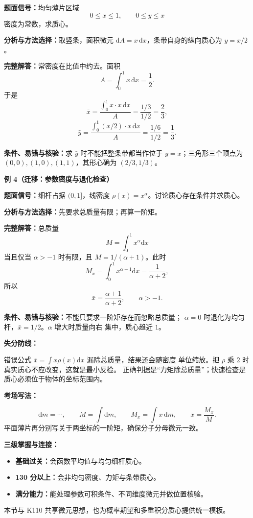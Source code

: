 \begin{knowledgeBox}
\textbf{题面信号：}均匀薄片区域
\[
0\le x\le1,\qquad0\le y\le x
\]
密度为常数，求质心。

\textbf{分析与方法选择：}取竖条，面积微元
\(\mathrm dA=x\,\mathrm dx\)，条带自身的纵向质心为 \(y=x/2\)。

\textbf{完整解答：}常密度在比值中约去。面积
\[
A=\int_0^1x\,\mathrm dx=\frac12.
\]
于是
\[
\bar x=\frac{\int_0^1x\cdot x\,\mathrm dx}{A}
=\frac{1/3}{1/2}=\frac23,
\]
\[
\bar y=\frac{\int_0^1(x/2)\cdot x\,\mathrm dx}{A}
=\frac{1/6}{1/2}=\frac13.
\]

\textbf{条件、易错与核验：}求 \(\bar y\) 时不能把整条带都当作位于
\(y=x\)；三角形三个顶点为 \((0,0),(1,0),(1,1)\)，其形心确为
\((2/3,1/3)\)。

\textbf{例 4（迁移：参数密度与退化检查）}

\textbf{题面信号：}细杆占据 \((0,1]\)，线密度
\(\rho(x)=x^\alpha\)。讨论质心存在条件并求质心。

\textbf{分析与方法选择：}先要求总质量有限；再算一阶矩。

\textbf{完整解答：}总质量
\[
M=\int_0^1x^\alpha\mathrm dx
\]
当且仅当 \(\alpha>-1\) 时有限，且 \(M=1/(\alpha+1)\)。此时
\[
M_x=\int_0^1x^{\alpha+1}\mathrm dx=\frac1{\alpha+2},
\]
所以
\[
\boxed{\bar x=\frac{\alpha+1}{\alpha+2}},\qquad\alpha>-1.
\]

\textbf{条件、易错与核验：}不能只要求一阶矩存在而忽略总质量；
\(\alpha=0\) 时退化为均匀杆，\(\bar x=1/2\)。\(\alpha\) 增大时质量向右
集中，质心趋近 \(1\)。

\textbf{失分防线：}

错误公式 \(\bar x=\int x\rho(x)\mathrm dx\) 漏除总质量，结果还会随密度
单位缩放。把 \(\rho\) 乘 \(2\) 时真实质心不应改变，这就是最小反检。
正确判据是“力矩除总质量”；快速检查是质心必须位于物体的坐标范围内。

\textbf{考场写法：}

\[
\mathrm dm=\cdots,\qquad
M=\int\mathrm dm,\qquad
M_x=\int x\,\mathrm dm,\qquad
\bar x=\frac{M_x}{M}.
\]
平面薄片再分别写关于两坐标的一阶矩，确保分子分母微元一致。

\textbf{三级掌握与连接：}
\begin{itemize}
  \item \textbf{基础过关：}会函数平均值与均匀细杆质心。
  \item \textbf{130 分以上：}会非均匀密度、力矩与条带质心。
  \item \textbf{满分能力：}能处理参数可积条件、不同维度微元并做位置核验。
\end{itemize}
本节与 K110 共享微元思想，也为概率期望和多重积分质心提供统一模板。
\end{knowledgeBox}
